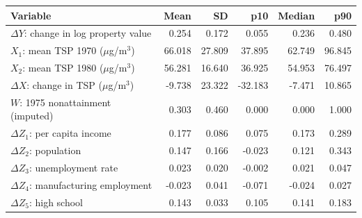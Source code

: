 \begin{tabular}{lrrrrr}
\toprule
Variable & Mean & SD & p10 & Median & p90 \\
\midrule
$\Delta Y$: change in log property value & 0.254 & 0.172 & 0.055 & 0.236 & 0.480 \\
$X_1$: mean TSP 1970 ($\mu$g/m$^3$) & 66.018 & 27.809 & 37.895 & 62.749 & 96.845 \\
$X_2$: mean TSP 1980 ($\mu$g/m$^3$) & 56.281 & 16.640 & 36.925 & 54.953 & 76.497 \\
$\Delta X$: change in TSP ($\mu$g/m$^3$) & -9.738 & 23.322 & -32.183 & -7.471 & 10.865 \\
$W$: 1975 nonattainment (imputed) & 0.303 & 0.460 & 0.000 & 0.000 & 1.000 \\
$\Delta Z_1$: per capita income & 0.177 & 0.086 & 0.075 & 0.173 & 0.289 \\
$\Delta Z_2$: population & 0.147 & 0.166 & -0.023 & 0.121 & 0.343 \\
$\Delta Z_3$: unemployment rate & 0.023 & 0.020 & -0.002 & 0.021 & 0.047 \\
$\Delta Z_4$: manufacturing employment & -0.023 & 0.041 & -0.071 & -0.024 & 0.027 \\
$\Delta Z_5$: high school & 0.143 & 0.033 & 0.105 & 0.141 & 0.183 \\
\bottomrule
\end{tabular}

